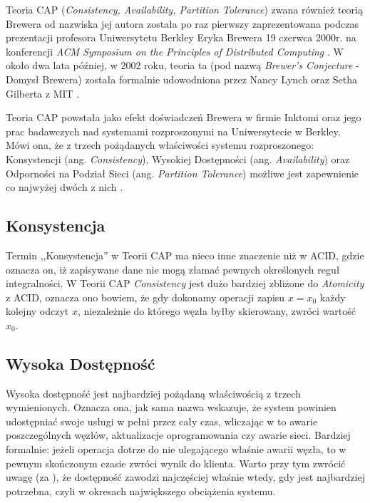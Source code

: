 Teoria CAP (\emph{Consistency, Availability, Partition Tolerance}) zwana również teorią Brewera od nazwiska jej autora została po raz pierwszy zaprezentowana podczas prezentacji profesora Uniwersytetu Berkley Eryka Brewera 19 czerwca 2000r. na konferencji \emph{ACM Symposium on the Principles of Distributed Computing} \cite{podc-keynote}. 
W około dwa lata później, w 2002 roku, teoria ta (pod nazwą \emph{Brewer's Conjecture} - Domysł Brewera) została formalnie udowodniona przez Nancy Lynch oraz Setha Gilberta z MIT \cite{brewers-conjecture}.

Teoria CAP powstała jako efekt doświadczeń Brewera w firmie Inktomi oraz jego prac badawczych nad systemami rozproszonymi na Uniwersytecie w Berkley. 
Mówi ona, że z trzech pożądanych właściwości systemu rozproszonego: Konsystencji (ang. \emph{Consistency}), Wysokiej Dostępności (ang. \emph{Availability}) oraz Odporności na Podział Sieci (ang. \emph{Partition Tolerance}) możliwe jest zapewnienie co najwyżej dwóch z nich \cite{browne-cap-theorem}.

\subsection*{Konsystencja}

Termin ,,Konsystencja'' w Teorii CAP ma nieco inne znaczenie niż w ACID, gdzie oznacza on, iż zapisywane dane nie mogą złamać pewnych określonych reguł integralności. 
W Teorii CAP \emph{Consistency} jest dużo bardziej zbliżone do \emph{Atomicity} z ACID, oznacza ono bowiem, że gdy dokonamy operacji zapisu $x=x_0$ każdy kolejny odczyt $x$, niezależnie do którego węzła byłby skierowany, zwróci wartość $x_0$.

\subsection*{Wysoka Dostępność}

Wysoka dostępność jest najbardziej pożądaną właściwością z trzech wymienionych.
Oznacza ona, jak sama nazwa wskazuje, że system powinien udostępniać swoje usługi w pełni przez cały czas, wliczając w to awarie poszczególnych węzłów, aktualizacje oprogramowania czy awarie sieci. 
Bardziej formalnie: jeżeli operacja dotrze do nie ulegającego właśnie awarii węzła, to w pewnym skończonym czasie zwróci wynik do klienta.
Warto przy tym zwrócić uwagę (za  \cite{brewers-conjecture}), że dostępność zawodzi najczęściej właśnie wtedy, gdy jest najbardziej potrzebna, czyli w okresach największego obciążenia systemu.

